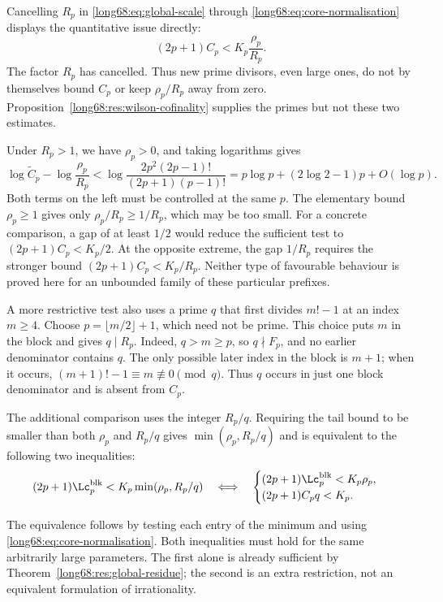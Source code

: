 Cancelling $R_p$ in \eqref{long68:eq:global-scale} through
\eqref{long68:eq:core-normalisation} displays the quantitative issue directly:
\begin{equation}\label{long68:eq:core-gap-scale}
 (2p+1)C_p<K_p\frac{\rho_p}{R_p}.
\end{equation}
The factor $R_p$ has cancelled. Thus new prime divisors, even large ones,
do not by themselves bound $C_p$ or keep $\rho_p/R_p$ away from zero.
Proposition~\ref{long68:res:wilson-cofinality} supplies the primes but not
these two estimates.

Under $R_p>1$, we have $\rho_p>0$, and taking logarithms gives
\[
 \log\widetilde C_p-\log\frac{\rho_p}{R_p}
 <\log\frac{2p^2(2p-1)!}{(2p+1)(p-1)!}
 =p\log p+(2\log2-1)p+O(\log p).
\]
Both terms on the left must be controlled at the same $p$. The elementary
bound $\rho_p\ge1$ gives only $\rho_p/R_p\ge1/R_p$, which may be too small.
For a concrete comparison, a gap of at least $1/2$ would reduce the sufficient
test to $(2p+1)C_p<K_p/2$. At the opposite extreme, the gap $1/R_p$ requires
the stronger bound $(2p+1)C_p<K_p/R_p$. Neither type of favourable behaviour
is proved here for an unbounded family of these particular prefixes.

\label{long68:res:lead-moving-factor-split}
\label{long68:res:moving-factor-scale-split}
A more restrictive test also uses a prime $q$ that first divides $m!-1$
at an index $m\ge4$. Choose $p=\lfloor m/2\rfloor+1$, which need not be
prime. This choice puts $m$ in the block and gives $q\mid R_p$. Indeed,
$q>m\ge p$, so $q\nmid F_p$, and no earlier denominator contains $q$.
The only possible later index in the block is $m+1$; when it occurs,
$(m+1)!-1\equiv m\not\equiv0\pmod q$. Thus $q$ occurs in just one block
denominator and is absent from $C_p$.

The additional comparison uses the integer $R_p/q$. Requiring the tail
bound to be smaller than both $\rho_p$ and $R_p/q$ gives
$\min(\rho_p,R_p/q)$ and is equivalent to the following two inequalities:
\begin{equation}\label{long68:eq:factor-split}
 (2p+1)\Lc^{\mathrm{blk}}_p<K_p\min(\rho_p,R_p/q)
 \quad\Longleftrightarrow\quad
 \begin{cases}
 (2p+1)\Lc^{\mathrm{blk}}_p<K_p\rho_p,\\
 (2p+1)C_pq<K_p .
 \end{cases}
\end{equation}


The equivalence follows by testing each entry of the minimum and using
\eqref{long68:eq:core-normalisation}. Both inequalities must hold for the
same arbitrarily large parameters. The first alone is already sufficient
by Theorem~\ref{long68:res:global-residue}; the second is an extra restriction,
not an equivalent formulation of irrationality.

